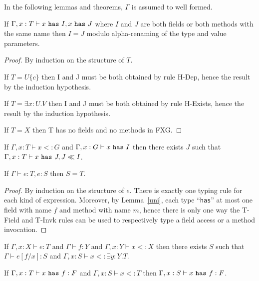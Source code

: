 In the following lemmas and theorems, $\Gamma$ is assumed to well formed.

\begin{lem}\label{uni}
If $\Gamma,x:T\vdash x~{\tt has}~I,x~{\tt has}~J$ where $I$ and $J$ are both fields or both methods with the same name then $I=J$ modulo alpha-renaming of the type and value parameters.
\end{lem}

\begin{proof}
By induction on the structure of $T$.
\item If $T=U\{c\}$ then I and J must be both obtained by rule {\sc H-Dep}, hence the result by the induction hypothesis.
\item If $T=\exists x:U.V$ then I and J must be both obtained by rule {\sc H-Exists}, hence the result by the induction hypothesis.
\item If $T=X$ then T has no fields and no methods in FXG.
\end{proof}


\begin{lem}
If $\Gamma,x:T\vdash x<:G$ and $\Gamma,x:G\vdash x~{\tt has}~I$ then there exists $J$ such that $\Gamma,x:T\vdash x~{\tt has}~J,J \ll I$.
\end{lem}



\begin{thm}\label{pri}
If $\Gamma\vdash e:T,e:S$ then $S=T$.
\end{thm}

\begin{proof}
By induction on the structure of $e$. There is exactly one typing rule for each kind of expression. Moreover, by Lemma~\ref{uni}, each type ``{\tt has}'' at most one field with name $f$ and method with name $m$, hence there is only one way the {\sc T-Field} and {\sc T-Invk} rules can be used to respectively type a field access or a method invocation.
\end{proof}

\begin{lem}\label{sub}
If $\Gamma,x:X\vdash e:T$ and $\Gamma\vdash f:Y$ and $\Gamma,x:Y\vdash x<:X$ then there exists $S$ such that $\Gamma\vdash e[f/x]:S$ and $\Gamma,x:S\vdash x<:\exists y:Y.T$.
\end{lem}

\begin{lem}\label{suf}
If $\Gamma,x:T\vdash x~{\tt has}~f:F$ and $\Gamma,x:S\vdash x<:T$ then $\Gamma,x:S\vdash x~{\tt has}~f:F$.
\end{lem}

